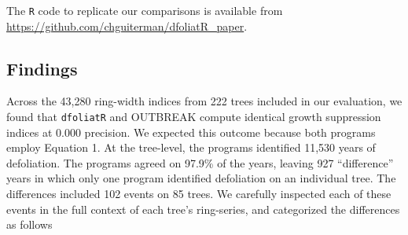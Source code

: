 \documentclass[review]{elsarticle} %
\begin{document}
The \texttt{R} code to replicate our comparisons is available from \url{https://github.com/chguiterman/dfoliatR_paper}.

\hypertarget{findings}{%
\subsection{Findings}\label{findings}}

Across the 43,280 ring-width indices from 222 trees included in our evaluation, we found that \texttt{dfoliatR} and OUTBREAK compute identical growth suppression indices at 0.000 precision. We expected this outcome because both programs employ Equation 1. At the tree-level, the programs identified 11,530 years of defoliation. The programs agreed on 97.9\% of the years, leaving 927 ``difference'' years in which only one program identified defoliation on an individual tree. The differences included 102 events on 85 trees. We carefully inspected each of these events in the full context of each tree's ring-series, and categorized the differences as follows
\end{document}
